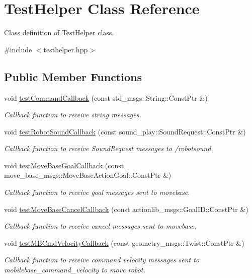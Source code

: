 \hypertarget{classTestHelper}{\section{Test\-Helper Class Reference}
\label{classTestHelper}
}


Class definition of \hyperlink{classTestHelper}{Test\-Helper} class.  




{\ttfamily \#include $<$testhelper.\-hpp$>$}

\subsection*{Public Member Functions}
\begin{DoxyCompactItemize}
\item 
void \hyperlink{classTestHelper_a75740dcf3bb18cb57208228c3723df2a}{test\-Command\-Callback} (const std\-\_\-msgs\-::\-String\-::\-Const\-Ptr \&)
\begin{DoxyCompactList}\small\item\em Callback function to receive string messages. \end{DoxyCompactList}\item 
void \hyperlink{classTestHelper_ac1ffd4f4c1e2668f817a229212a8c904}{test\-Robot\-Sound\-Callback} (const sound\-\_\-play\-::\-Sound\-Request\-::\-Const\-Ptr \&)
\begin{DoxyCompactList}\small\item\em Callback function to receive Sound\-Request messages to /robotsound. \end{DoxyCompactList}\item 
void \hyperlink{classTestHelper_a21129fa567d2c7b386928240c022f587}{test\-Move\-Base\-Goal\-Callback} (const move\-\_\-base\-\_\-msgs\-::\-Move\-Base\-Action\-Goal\-::\-Const\-Ptr \&)
\begin{DoxyCompactList}\small\item\em Callback function to receive goal messages sent to movebase. \end{DoxyCompactList}\item 
void \hyperlink{classTestHelper_a7b581728a4a731facdcc5b672362372f}{test\-Move\-Base\-Cancel\-Callback} (const actionlib\-\_\-msgs\-::\-Goal\-I\-D\-::\-Const\-Ptr \&)
\begin{DoxyCompactList}\small\item\em Callback function to receive cancel messages sent to movebase. \end{DoxyCompactList}\item 
void \hyperlink{classTestHelper_a5fecfcf3a265ba49f7c5ab1acb064f06}{test\-M\-B\-Cmd\-Velocity\-Callback} (const geometry\-\_\-msgs\-::\-Twist\-::\-Const\-Ptr \&)
\begin{DoxyCompactList}\small\item\em Callback function to receive command velocity messages sent to mobilebase\-\_\-command\-\_\-velocity to move robot. \end{DoxyCompactList}\end{DoxyCompactItemize}
